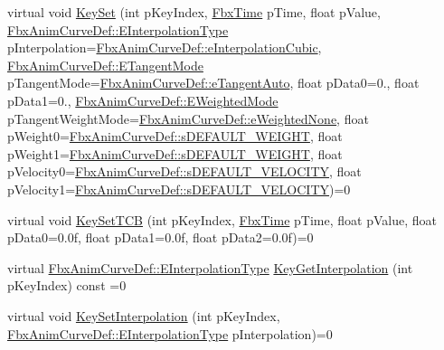 \begin{DoxyCompactItemize}
\item 
virtual void \hyperlink{class_fbx_anim_curve_a70bb71da0c56a32be961384c015bb812}{Key\+Set} (int p\+Key\+Index, \hyperlink{class_fbx_time}{Fbx\+Time} p\+Time, float p\+Value, \hyperlink{class_fbx_anim_curve_def_add2ab7d10d856ab0868cc9b143d59ea5}{Fbx\+Anim\+Curve\+Def\+::\+E\+Interpolation\+Type} p\+Interpolation=\hyperlink{class_fbx_anim_curve_def_add2ab7d10d856ab0868cc9b143d59ea5a16ef50fcdbb8ae99246f06e12f9d3dae}{Fbx\+Anim\+Curve\+Def\+::e\+Interpolation\+Cubic}, \hyperlink{class_fbx_anim_curve_def_ac810ccc5ca0527704ab5175479964b87}{Fbx\+Anim\+Curve\+Def\+::\+E\+Tangent\+Mode} p\+Tangent\+Mode=\hyperlink{class_fbx_anim_curve_def_ac810ccc5ca0527704ab5175479964b87a56e3bad364851277281e94e81327dd25}{Fbx\+Anim\+Curve\+Def\+::e\+Tangent\+Auto}, float p\+Data0=0., float p\+Data1=0., \hyperlink{class_fbx_anim_curve_def_aeee6e9cc12501e10dbd3e5caaf66990e}{Fbx\+Anim\+Curve\+Def\+::\+E\+Weighted\+Mode} p\+Tangent\+Weight\+Mode=\hyperlink{class_fbx_anim_curve_def_aeee6e9cc12501e10dbd3e5caaf66990ea2ae55a3ceae7773d899ebfae26dcbef3}{Fbx\+Anim\+Curve\+Def\+::e\+Weighted\+None}, float p\+Weight0=\hyperlink{class_fbx_anim_curve_def_a6fd6b3907962eba0b1e71f28b55fad9d}{Fbx\+Anim\+Curve\+Def\+::s\+D\+E\+F\+A\+U\+L\+T\+\_\+\+W\+E\+I\+G\+HT}, float p\+Weight1=\hyperlink{class_fbx_anim_curve_def_a6fd6b3907962eba0b1e71f28b55fad9d}{Fbx\+Anim\+Curve\+Def\+::s\+D\+E\+F\+A\+U\+L\+T\+\_\+\+W\+E\+I\+G\+HT}, float p\+Velocity0=\hyperlink{class_fbx_anim_curve_def_abebd0a6078f18802836059fdefb36862}{Fbx\+Anim\+Curve\+Def\+::s\+D\+E\+F\+A\+U\+L\+T\+\_\+\+V\+E\+L\+O\+C\+I\+TY}, float p\+Velocity1=\hyperlink{class_fbx_anim_curve_def_abebd0a6078f18802836059fdefb36862}{Fbx\+Anim\+Curve\+Def\+::s\+D\+E\+F\+A\+U\+L\+T\+\_\+\+V\+E\+L\+O\+C\+I\+TY})=0
\item 
virtual void \hyperlink{class_fbx_anim_curve_af5319507799c6eea17c6550465065f8f}{Key\+Set\+T\+CB} (int p\+Key\+Index, \hyperlink{class_fbx_time}{Fbx\+Time} p\+Time, float p\+Value, float p\+Data0=0.\+0f, float p\+Data1=0.\+0f, float p\+Data2=0.\+0f)=0
\item 
virtual \hyperlink{class_fbx_anim_curve_def_add2ab7d10d856ab0868cc9b143d59ea5}{Fbx\+Anim\+Curve\+Def\+::\+E\+Interpolation\+Type} \hyperlink{class_fbx_anim_curve_a14158288d26a4fc08c6ae7b2ff8d6638}{Key\+Get\+Interpolation} (int p\+Key\+Index) const =0
\item 
virtual void \hyperlink{class_fbx_anim_curve_aa9de6c77c7d81def717ff34f01a660fb}{Key\+Set\+Interpolation} (int p\+Key\+Index, \hyperlink{class_fbx_anim_curve_def_add2ab7d10d856ab0868cc9b143d59ea5}{Fbx\+Anim\+Curve\+Def\+::\+E\+Interpolation\+Type} p\+Interpolation)=0

\end{DoxyCompactItemize}
